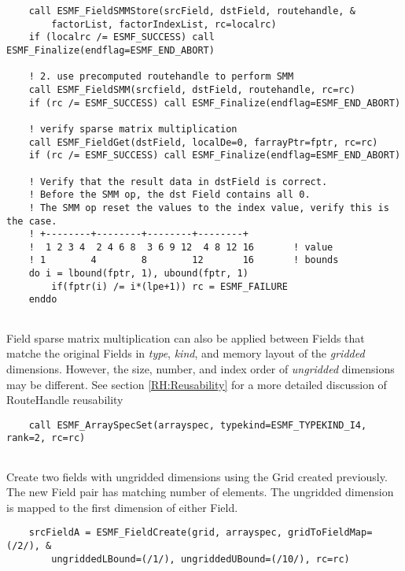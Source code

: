 \begin{verbatim}
    call ESMF_FieldSMMStore(srcField, dstField, routehandle, &
        factorList, factorIndexList, rc=localrc)
    if (localrc /= ESMF_SUCCESS) call ESMF_Finalize(endflag=ESMF_END_ABORT)

    ! 2. use precomputed routehandle to perform SMM
    call ESMF_FieldSMM(srcfield, dstField, routehandle, rc=rc)
    if (rc /= ESMF_SUCCESS) call ESMF_Finalize(endflag=ESMF_END_ABORT)

    ! verify sparse matrix multiplication
    call ESMF_FieldGet(dstField, localDe=0, farrayPtr=fptr, rc=rc)
    if (rc /= ESMF_SUCCESS) call ESMF_Finalize(endflag=ESMF_END_ABORT)

    ! Verify that the result data in dstField is correct.
    ! Before the SMM op, the dst Field contains all 0.
    ! The SMM op reset the values to the index value, verify this is the case.
    ! +--------+--------+--------+--------+
    !  1 2 3 4  2 4 6 8  3 6 9 12  4 8 12 16       ! value
    ! 1        4        8        12       16       ! bounds
    do i = lbound(fptr, 1), ubound(fptr, 1)
        if(fptr(i) /= i*(lpe+1)) rc = ESMF_FAILURE
    enddo
 
\end{verbatim}
 

   Field sparse matrix multiplication can also be applied between Fields 
   that matche the original Fields in {\em type}, {\em kind}, and 
   memory layout of the {\em gridded} dimensions. However, the size, number, 
   and index order of {\em ungridded} dimensions may be different. See section
   \ref{RH:Reusability} for a more detailed discussion of RouteHandle 
   reusability 

 \begin{verbatim}
    call ESMF_ArraySpecSet(arrayspec, typekind=ESMF_TYPEKIND_I4, rank=2, rc=rc)
 
\end{verbatim}
 

   Create two fields with ungridded dimensions using the Grid created previously.
   The new Field pair has matching number of elements. The ungridded dimension
   is mapped to the first dimension of either Field. 

 \begin{verbatim}
    srcFieldA = ESMF_FieldCreate(grid, arrayspec, gridToFieldMap=(/2/), &
        ungriddedLBound=(/1/), ungriddedUBound=(/10/), rc=rc)
 
\end{verbatim}
 
